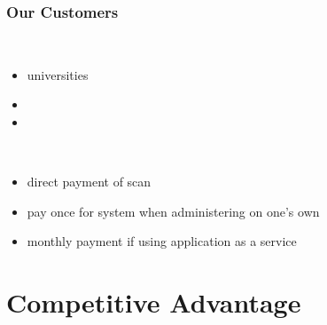 \begin{frame}
  \frametitle{Our Customers}
      \begin{description}[]
        \item[Profile] \hfill \\
        \begin{itemize}
          \item universities
          \item 
          \item 
        \end{itemize}

        \bigskip
        \item[Cost plan] \hfill \\
          \begin{itemize}
            \item direct payment of scan
            \item pay once for system when administering on one's own
            \item monthly payment if using application as a service
        \end{itemize}
      \end{description}

\end{frame}

\section{Competitive Advantage}

